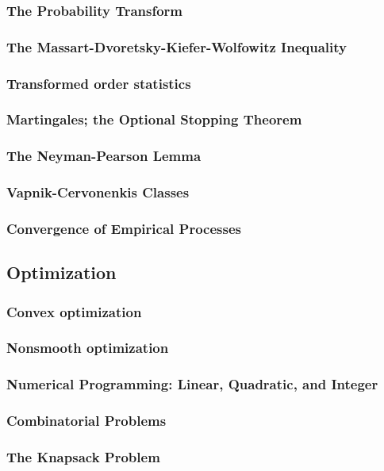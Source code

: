 \subsubsection{The Probability Transform}

\subsubsection{The Massart-Dvoretsky-Kiefer-Wolfowitz Inequality}

\subsubsection{Transformed order statistics}

\subsubsection{Martingales; the Optional Stopping Theorem}

\subsubsection{The Neyman-Pearson Lemma}

\subsubsection{Vapnik-Cervonenkis Classes}

\subsubsection{Convergence of Empirical Processes}

\subsection{Optimization}

\subsubsection{Convex optimization}

\subsubsection{Nonsmooth optimization}

\subsubsection{Numerical Programming: Linear, Quadratic, and Integer}

\subsubsection{Combinatorial Problems}

\subsubsection{The Knapsack Problem}






